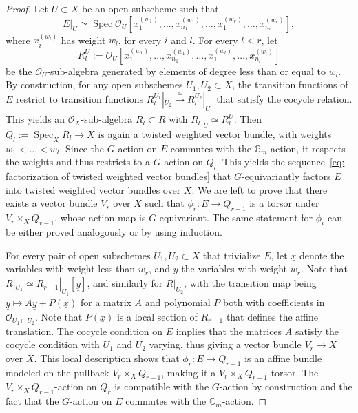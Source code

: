 \documentclass[12pt]{amsart}
\newcommand\spec{\operatorname{Spec}}
\newcommand\Gm{\mathbb{G}_m}
\newcommand{\sO}{\mathscr{O}}
\theoremstyle{definition}
\begin{document}
\begin{proof}
    Let $U\subset X$ be an open subscheme such that
    \[
        E|_U\simeq\spec\sO_{U}[x_1^{(w_1)},\ldots,x_{n_1}^{(w_1)},\ldots,x_1^{(w_r)},\ldots, x_{n_r}^{(w_r)}],
    \]
    where $x_i^{(w_l)}$ has weight $w_l$, for every $i$ and $l$. For every $l<r$, let
    \[
        R^U_l:=\sO_U[x_1^{(w_1)},\ldots,x_{n_1}^{(w_1)},\ldots,x_1^{(w_l)},\ldots,x_{n_l}^{(w_l)}]
    \]
    be the $\sO_U$-sub-algebra generated by elements of degree less than or equal to $w_l$. By construction, for any open subschemes $U_1,U_2\subset X$, the transition functions of $E$ restrict to transition functions $R_l^{U_1}|_{U_2}\xrightarrow{\simeq} R_l^{U_2}|_{U_1}$ that satisfy the cocycle relation. This yields an $\sO_X$-sub-algebra $R_l\subset R$ with $R_l|_U\simeq R_l^U$. Then $Q_l:=\spec_{X}\! R_l\rightarrow X$ is again a twisted weighted vector bundle, with weights $w_1<\ldots<w_l$. Since the $G$-action on $E$ commutes with the $\Gm$-action, it respects the weights and thus restricts to a $G$-action on $Q_l$. This yields the sequence~\eqref{eq: factorization of twisted weighted vector bundles} that $G$-equivariantly factors $E$ into twisted weighted vector bundles over $X$. We are left to prove that there exists a vector bundle $V_r$ over $X$ such that $\phi_r:E\rightarrow Q_{r-1}$ is a torsor under $V_r\times_{X}Q_{r-1}$, whose action map is $G$-equivariant. The same statement for $\phi_i$ can be either proved analogously or by using induction.
    
    For every pair of open subschemes $U_1,U_2\subset X$ that trivialize $E$, let $\underline{x}$ denote the variables with weight less than $w_r$, and $\underline{y}$ the variables with weight $w_r$. Note that $R|_{U_1}\simeq R_{r-1}|_{U_1}[\underline{y}]$, and similarly for $R|_{U_2}$, with the transition map being $\underline{y}\mapsto A\underline{y}+P(\underline{x})$ for a matrix $A$ and polynomial $P$ both with coefficients in $\sO_{U_1\cap U_2}$. Note that $P(\underline{x})$ is a local section of $R_{r-1}$ that defines the affine translation. The cocycle condition on $E$ implies that the matrices $A$ satisfy the cocycle condition with $U_1$ and $U_2$ varying, thus giving a vector bundle $V_r\rightarrow X$ over $X$. This local description shows that $\phi_r:E\rightarrow Q_{r-1}$ is an affine bundle modeled on the pullback $V_r\times_X Q_{r-1}$, making it a $V_r\times_X Q_{r-1}$-torsor. The $V_r\times_X Q_{r-1}$-action on $Q_r$ is compatible with the $G$-action by construction and the fact that the $G$-action on $E$ commutes with the $\Gm$-action.
\end{proof}
\end{document}
